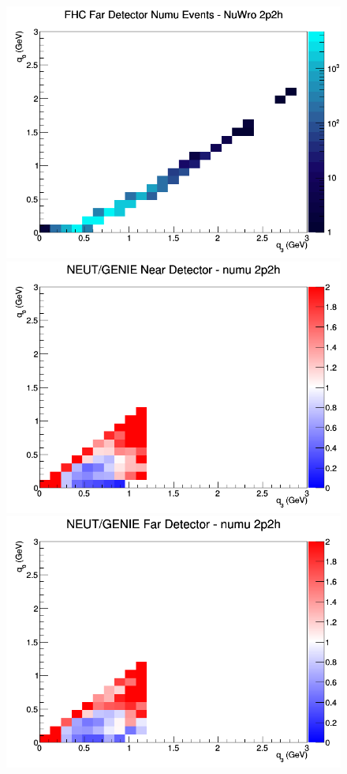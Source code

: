 \documentclass[12pt]{article}
\begin{document}
\begin{figure}[h]
\endminipage
{}
\includegraphics[width=\linewidth]{q0_q3/nominal/2p2h_FHC_FD_numu_q3_q0_NuWro.png}
\endminipage
\newline
{}
\includegraphics[width=\linewidth]{q0_q3/nominal/ratios/2p2h_NEUT_GENIE_numu_near_q3_q0.png}
\endminipage
{}
\includegraphics[width=\linewidth]{q0_q3/nominal/ratios/2p2h_NEUT_GENIE_numu_far_q3_q0.png}

\end{figure}
\end{document}
